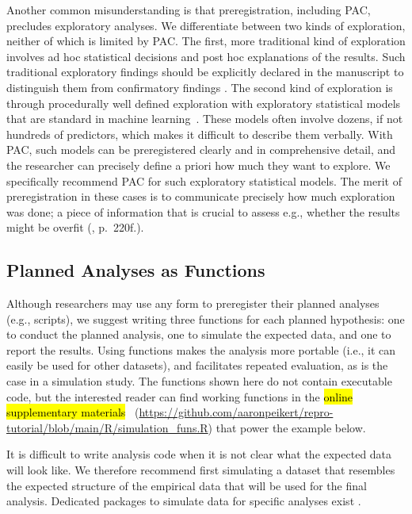 \documentclass[psych,tutorial,accept,moreauthors,pdftex]{Definitions/mdpi}
\begin{document}
\begin{paracol}{2}
Another common misunderstanding is that preregistration, including PAC,
precludes exploratory analyses. We differentiate between two kinds of
exploration, neither of which is limited by PAC. The first, more
traditional kind of exploration involves ad hoc statistical decisions
and post hoc explanations of the results. Such traditional exploratory
findings should be explicitly declared in the manuscript to distinguish
them from confirmatory findings
\citep{NosekRevolution2018, nosekPreregistrationHardWorthwhile2019}. The
second kind of exploration is through procedurally well defined
exploration with exploratory statistical models that are standard in
machine learning~\citep{brandmaier22mlsem}. These models often involve
dozens, if not hundreds of predictors, which makes it difficult to
describe them verbally. With PAC, such models can be preregistered
clearly and in comprehensive detail, and the researcher can precisely define
a priori how much they want to explore. We specifically recommend PAC
for such exploratory statistical models. The merit of preregistration in
these cases is to communicate precisely how much exploration was done; a
piece of information that is crucial to assess e.g., whether the results
might be overfit
(\citep{hastieElementsStatisticalLearning2017}, p.~220f.).

\subsection{Planned Analyses as
Functions}\label{planned-analyses-as-functions}

Although researchers may use any form to preregister their planned
analyses (e.g., scripts), we suggest writing three functions for each
planned hypothesis: one to conduct the planned analysis, one to simulate
the expected data, and one to report the results. Using functions makes the
analysis more portable (i.e., it can easily be used for other datasets),
and facilitates repeated evaluation, as is the case in a simulation
study. The functions shown here do not contain executable code, but the
interested reader can find working functions in the \hl{online
supplementary materials}
~(\url{https://github.com/aaronpeikert/repro-tutorial/blob/main/R/simulation_funs.R}) that power the example below.

It is difficult to write analysis code when it is not clear what the
expected data will look like. We therefore recommend first simulating a
dataset that resembles the expected structure of the empirical data that
will be used for the final analysis. Dedicated packages to simulate data
for specific analyses exist .


\end{paracol}
\end{document}
